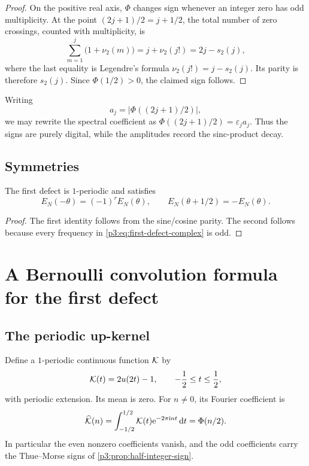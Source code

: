 \documentclass[11pt,oneside]{article}
\numberwithin{equation}{section}
\theoremstyle{definition}
\theoremstyle{remark}
\newcommand{\e}{\mathrm e}
\newcommand{\dd}{\,\mathrm d}
\newcommand{\eps}{\varepsilon}
\newcommand{\abs}[1]{\left|#1\right|}
\begin{document}
\begin{proof}
On the positive real axis, $\Phi$ changes sign whenever an integer zero has odd multiplicity.  At the point $(2j+1)/2=j+1/2$, the total number of zero crossings, counted with multiplicity, is
\[
 \sum_{m=1}^{j}\bigl(1+\nu_2(m)\bigr)
 =j+\nu_2(j!)
 =2j-s_2(j),
\]
where the last equality is Legendre's formula $\nu_2(j!)=j-s_2(j)$.  Its parity is therefore $s_2(j)$.  Since $\Phi(1/2)>0$, the claimed sign follows.
\end{proof}

Writing
\begin{equation}
 a_j=\abs{\Phi((2j+1)/2)},
 \label{p3:eq:half-amplitudes}
\end{equation}
we may rewrite the spectral coefficient as $\Phi((2j+1)/2)=\eps_ja_j$.  Thus the signs are purely digital, while the amplitudes record the sinc-product decay.

\subsection{Symmetries}

\begin{corollary}
\label{p3:cor:defect-symmetries}
The first defect is $1$-periodic and satisfies
\begin{equation}
 E_N(-\theta)=(-1)^rE_N(\theta),
 \qquad
 E_N(\theta+1/2)=-E_N(\theta).
 \label{p3:eq:defect-symmetries}
\end{equation}
\end{corollary}

\begin{proof}
The first identity follows from the sine/cosine parity.  The second follows because every frequency in \eqref{p3:eq:first-defect-complex} is odd.
\end{proof}

\section{A Bernoulli convolution formula for the first defect}
\label{p3:sec:bernoulli-kernel}

\subsection{The periodic up-kernel}

Define a $1$-periodic continuous function $\mathcal K$ by
\begin{equation}
 \mathcal K(t)=2u(2t)-1,
 \qquad -\frac12\le t\le\frac12,
 \label{p3:eq:K-kernel}
\end{equation}
with periodic extension.  Its mean is zero.  For $n\ne0$, its Fourier coefficient is
\begin{equation}
 \widehat{\Kcal}(n)
 =\int_{-1/2}^{1/2}\Kcal(t)\e^{-2\pi\iu nt}\dd t
 =\Phi(n/2).
 \label{p3:eq:K-Fourier}
\end{equation}
In particular the even nonzero coefficients vanish, and the odd coefficients carry the Thue--Morse signs of \cref{p3:prop:half-integer-sign}.
\end{document}
